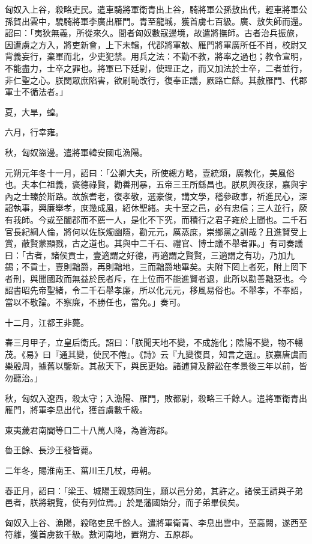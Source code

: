 \begin{pinyinscope}
匈奴入上谷，殺略吏民。遣車騎將軍衛青出上谷，騎將軍公孫敖出代，輕車將軍公孫賀出雲中，驍騎將軍李廣出雁門。青至龍城，獲首虜七百級。廣、敖失師而還。詔曰：「夷狄無義，所從來久。間者匈奴數寇邊境，故遣將撫師。古者治兵振旅，因遭虜之方入，將吏新會，上下未輯，代郡將軍敖、雁門將軍廣所任不肖，校尉又背義妄行，棄軍而北，少吏犯禁。用兵之法：不勤不教，將率之過也；教令宣明，不能盡力，士卒之罪也。將軍已下廷尉，使理正之，而又加法於士卒，二者並行，非仁聖之心。朕閔眾庶陷害，欲刷恥改行，復奉正議，厥路亡繇。其赦雁門、代郡軍士不循法者。」

夏，大旱，蝗。

六月，行幸雍。

秋，匈奴盜邊。遣將軍韓安國屯漁陽。

元朔元年冬十一月，詔曰：「公卿大夫，所使總方略，壹統類，廣教化，美風俗也。夫本仁祖義，褒德祿賢，勸善刑暴，五帝三王所繇昌也。朕夙興夜寐，嘉與宇內之士臻於斯路。故旅耆老，復孝敬，選豪俊，講文學，稽參政事，祈進民心，深詔執事，興廉舉孝，庶幾成風，紹休聖緒。夫十室之邑，必有忠信；三人並行，厥有我師。今或至闔郡而不薦一人，是化不下究，而積行之君子雍於上聞也。二千石官長紀綱人倫，將何以佐朕燭幽隱，勸元元，厲蒸庶，崇鄉黨之訓哉？且進賢受上賞，蔽賢蒙顯戮，古之道也。其與中二千石、禮官、博士議不舉者罪。」有司奏議曰：「古者，諸侯貢士，壹適謂之好德，再適謂之賢賢，三適謂之有功，乃加九錫；不貢士，壹則黜爵，再則黜地，三而黜爵地畢矣。夫附下罔上者死，附上罔下者刑，與聞國政而無益於民者斥，在上位而不能進賢者退，此所以勸善黜惡也。今詔書昭先帝聖緒，令二千石舉孝廉，所以化元元，移風易俗也。不舉孝，不奉詔，當以不敬論。不察廉，不勝任也，當免。」奏可。

十二月，江都王非薨。

春三月甲子，立皇后衛氏。詔曰：「朕聞天地不變，不成施化；陰陽不變，物不暢茂。《易》曰『通其變，使民不倦』。《詩》云『九變復貫，知言之選』。朕嘉唐虞而樂殷周，據舊以鑒新。其赦天下，與民更始。諸逋貸及辭訟在孝景後三年以前，皆勿聽治。」

秋，匈奴入遼西，殺太守；入漁陽、雁門，敗都尉，殺略三千餘人。遣將軍衛青出雁門，將軍李息出代，獲首虜數千級。

東夷薉君南閭等口二十八萬人降，為蒼海郡。

魯王餘、長沙王發皆薨。

二年冬，賜淮南王、菑川王几杖，毋朝。

春正月，詔曰：「梁王、城陽王親慈同生，願以邑分弟，其許之。諸侯王請與子弟邑者，朕將親覽，使有列位焉。」於是藩國始分，而子弟畢侯矣。

匈奴入上谷、漁陽，殺略吏民千餘人。遣將軍衛青、李息出雲中，至高闕，遂西至符離，獲首虜數千級。數河南地，置朔方、五原郡。


\end{pinyinscope}
